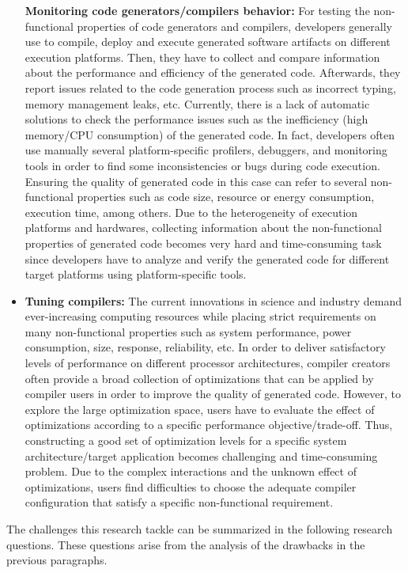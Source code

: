 \begin{itemize}
\textbf{Monitoring code generators/compilers behavior:} For testing the non-functional properties of code generators and compilers, developers generally use to compile, deploy and execute generated software artifacts on different execution platforms. Then, they have to collect and compare information about the performance and efficiency of the generated code. Afterwards, they report issues related to the code generation process such as incorrect typing, memory management leaks, etc.
Currently, there is a lack of automatic solutions to check the performance issues such as the inefficiency (high memory/CPU consumption) of the generated code. In fact, developers often use manually several platform-specific profilers, debuggers, and monitoring tools\cite{guana2014chaintracker,delgado2004taxonomy} in order to find some inconsistencies or bugs during code execution. Ensuring the quality of generated code in this case can refer to several non-functional properties such as code size, resource or energy consumption, execution time, among others\cite{pan2006fast}. Due to the heterogeneity of execution platforms and hardwares, collecting information about the non-functional properties of generated code becomes very hard and time-consuming task since developers have to analyze and verify the generated code for different target platforms using platform-specific tools. 
\item
\textbf{Tuning compilers:} The current innovations in science and industry demand ever-increasing computing resources while placing strict requirements on many non-functional properties such as system performance, power consumption, size, response, reliability, etc. In order to deliver satisfactory levels of performance on different processor architectures, compiler creators often provide a broad collection of optimizations that can be applied by compiler users in order to improve the quality of generated code. However, to explore the large optimization space, users have to evaluate the effect of optimizations according to a specific performance objective/trade-off. Thus, constructing a good set of optimization levels for a specific system architecture/target application becomes challenging and time-consuming problem. Due to the complex interactions and the unknown effect of optimizations, users find difficulties to choose the adequate compiler configuration that satisfy a specific non-functional requirement.





 


\end{itemize}
The challenges this research tackle can be summarized in the following research questions. These questions arise from the analysis of the drawbacks in the previous paragraphs.

